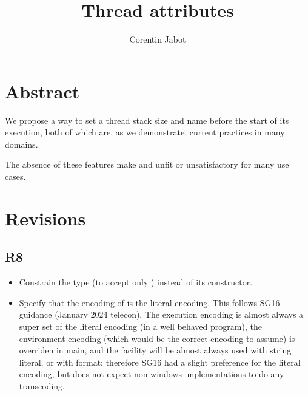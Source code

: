 \documentclass{wg21}
\title{Thread attributes}
\author{Corentin Jabot}{corentin.jabot@gmail.com}
\begin{document}
\maketitle

\setlength{\arrayrulewidth}{0.2mm}
\setlength{\tabcolsep}{8pt}
\renewcommand{\arraystretch}{1.}

\def\changemargin#1#2{\list{}{\rightmargin#2\leftmargin#1}\item[]}
\let\endchangemargin=\endlist
\setlength\extrarowheight{5pt}


\section{Abstract}

We propose a way to set a thread stack size and name before the start of its execution, both of which are,
as we demonstrate, current practices in many domains.

The absence of these features make  and  unfit or unsatisfactory for many use cases.

\section{Revisions}

\subsection{R8}
\begin{itemize}
\item Constrain the type  (to accept only ) instead of its constructor.
\item Specify that the encoding of  is the literal encoding.
      This follows SG16 guidance (January 2024 telecon).
      The execution encoding is almost always a super set of the literal encoding (in a well behaved program), the environment encoding (which would be the correct encoding to assume) is overriden in main, and the facility will be almost always used with string literal, or with format;
      therefore SG16 had a slight preference for the literal encoding, but does not expect non-windows implementations to do any transcoding.
\end{itemize}
\end{document}
